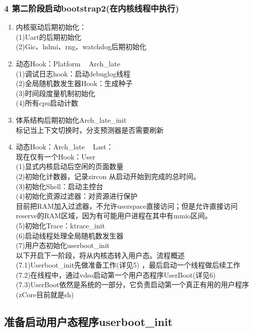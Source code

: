 \documentclass[
8pt, %
]{beamer}
\begin{document}
	\begin{frame}
		\frametitle{4 第二阶段启动bootstrap2(在内核线程中执行)}
		\begin{enumerate}
			\item 内核驱动后期初始化：\\
			(1)Uart的后期初始化\\
			(2)Gic、hdmi、rng、watchdog后期初始化
			\item 动态Hook：Platform ~ Arch\_late\\
			(1)调试日志hook：启动debuglog线程\\
			(2)全局随机数发生器Hook：生成种子\\
			(3)时间段度量机制初始化\\
			(4)所有cpu启动计数
			\item 体系结构后期初始化Arch\_late\_init\\
			标记当上下文切换时，分支预测器是否需要刷新
			\item 动态Hook：Arch\_late ~ Last：\\
			现在仅有一个Hook：User\\
			(1)显式内核启动后空闲的页面数量\\
			(2)初始化计数器，记录zircon 从启动开始到完成的总时间。\\
			(3)初始化Shell：启动主控台\\
			(4)初始化资源过滤器：对资源进行保护\\
			目前把RAM加入过滤器，不允许userspace直接访问；但是允许直接访问reserve的RAM区域，因为有可能用户进程在其中有mmio区间。\\
			(5)初始化Trace：ktrace\_init\\
			(6)启动线程处理全局随机数发生器\\
			(7)用户态初始化userboot\_init\\
			以下开启下一阶段，将从内核态转入用户态。流程概述\\
			(7.1)Userboot\_init先做准备工作(详见5) ，最后启动一个线程做后续工作\\
			(7.2)在线程中，通过vdso启动第一个用户态程序UserBoot(详见6)\\
			(7.3)UserBoot依然是系统的一部分，它负责启动第一个真正有用的用户程序(zCore目前就是sh)
		\end{enumerate}
	\end{frame}

	\subsection{准备启动用户态程序userboot\_init}
	
\end{document}
